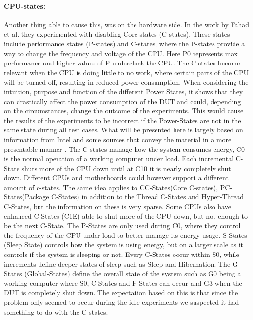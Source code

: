 \paragraph{CPU-states:} Another thing able to cause this, was on the hardware side. In the work by Fahad et al.\cite*[]{fahad2019comparative} they experimented with disabling Core-states (C-states). These states include performance states (P-states) and C-states\cite[]{PCStat}, where the P-states provide a way to change the frequency and voltage of the CPU. Here P0 represents max performance and higher values of P underclock the CPU. The C-states become relevant when the CPU is doing little to no work, where certain parts of the CPU will be turned off, resulting in reduced power consumption. When considering the intuition, purpose and function of the different Power States, it shows that they can drastically affect the power consumption of the DUT and could, depending on the circumstances, change the outcome of the experiments. This would cause the results of the experiments to be incorrect if the Power-States are not in the same state during all test cases. What will be presented here is largely based on information from Intel\cite{CIntel} and some sources that convey the material in a more presentable manner \cite{CMete,CLinux}. The C-states manage how the system consumes energy, C0 is the normal operation of a working computer under load. Each incremental C-State shuts more of the CPU down until at C10 it is nearly completely shut down. Different CPUs and motherboards could however support a different amount of c-states. The same idea applies to CC-States(Core C-states), PC-States(Package C-States) in addition to the Thread C-States and Hyper-Thread C-States, but the information on these is very sparse. Some CPUs also have enhanced C-States (C1E) able to shut more of the CPU down, but not enough to be the next C-State. The P-States are only used during C0, where they control the frequency of the CPU under load to better manage its energy usage. S-States (Sleep State) controls how the system is using energy, but on a larger scale as it controls if the system is sleeping or not. Every C-States occur within S0, while increments define deeper states of sleep such as Sleep and Hibernation. The G-States (Global-States) define the overall state of the system such as G0 being a working computer where S0, C-States and P-States can occur and G3 when the DUT is completely shut down. The expectation based on this is that since the problem only seemed to occur during the idle experiments we suspected it had something to do with the C-states.

